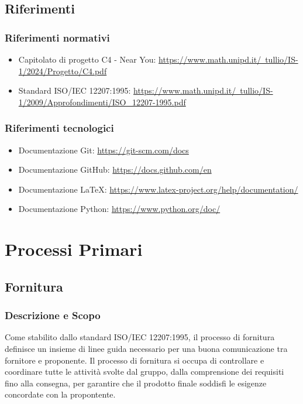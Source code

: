 \documentclass[10pt]{article}
\begin{document}
\begin{justify}
    \subsection{Riferimenti}
        \subsubsection{Riferimenti normativi}
        \begin{itemize}
            \item Capitolato di progetto C4 - Near You: \href{https://www.math.unipd.it/~tullio/IS-1/2024/Progetto/C4.pdf}{https://www.math.unipd.it/~tullio/IS-1/2024/Progetto/C4.pdf}
            \item Standard ISO/IEC 12207:1995: \href{https://www.math.unipd.it/~tullio/IS-1/2009/Approfondimenti/ISO_12207-1995.pdf}{https://www.math.unipd.it/~tullio/IS-1/2009/Approfondimenti/ISO_12207-1995.pdf}
        \end{itemize}
        \subsubsection{Riferimenti tecnologici}
        \begin{itemize}
            \item Documentazione Git: \href{https://git-scm.com/docs}{https://git-scm.com/docs}
            \item Documentazione GitHub: \href{https://docs.github.com/en}{https://docs.github.com/en}
            \item Documentazione \LaTeX: \href{https://www.latex-project.org/help/documentation/}{https://www.latex-project.org/help/documentation/}
            \item Documentazione Python: \href{https://www.python.org/doc/}{https://www.python.org/doc/}
        \end{itemize}
        
\newpage
\section{Processi Primari}
    \subsection{Fornitura}

    \subsubsection{Descrizione e Scopo}
    Come stabilito dallo standard ISO/IEC 12207:1995, il processo di fornitura definisce un insieme di linee guida necessario per una buona comunicazione tra fornitore e proponente. Il processo di fornitura si occupa di controllare e coordinare tutte le attività svolte dal gruppo, dalla comprensione dei requisiti fino alla consegna, per garantire che il prodotto finale soddisfi le esigenze concordate con la propontente.\\


\end{justify}
\end{document}
